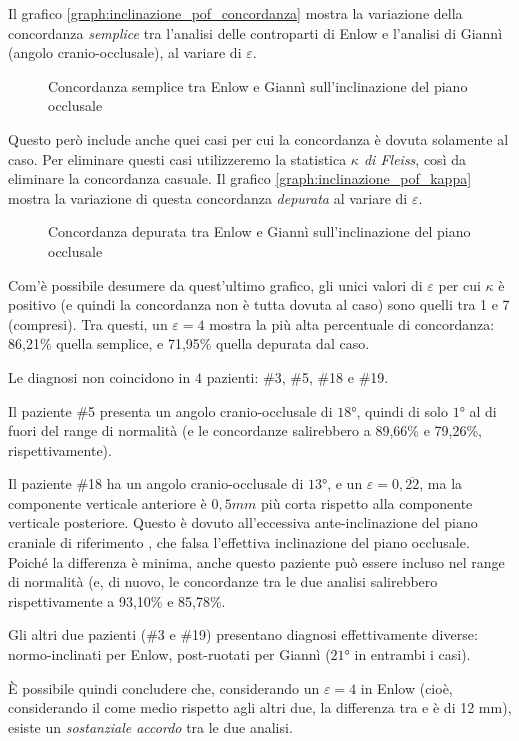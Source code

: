 Il grafico \vref{graph:inclinazione_pof_concordanza} mostra la variazione della concordanza \emph{semplice} tra l'analisi delle controparti di Enlow e l'analisi di Giannì (angolo cranio-occlusale), al variare di $\varepsilon$.

\begin{figure}[ht!]
\centering

\caption{Concordanza semplice tra Enlow e Giannì sull'inclinazione del piano occlusale}
\label{graph:inclinazione_pof_concordanza}
\end{figure}

Questo però include anche quei casi per cui la concordanza è dovuta solamente al caso. Per eliminare questi casi utilizzeremo la statistica \emph{$\kappa$ di Fleiss}, così da eliminare la concordanza casuale. Il grafico \vref{graph:inclinazione_pof_kappa} mostra la variazione di questa concordanza \emph{depurata} al variare di $\varepsilon$.

\begin{figure}[ht!]
\centering

\caption{Concordanza depurata tra Enlow e Giannì sull'inclinazione del piano occlusale}
\label{graph:inclinazione_pof_depurata}
\end{figure}

Com'è possibile desumere da quest'ultimo grafico, gli unici valori di $\varepsilon$ per cui $\kappa$ è positivo (e quindi la concordanza non è tutta dovuta al caso) sono quelli tra 1 e 7 (compresi). Tra questi, un $\varepsilon = 4$ mostra la più alta percentuale di concordanza: 86,21\% quella semplice, e 71,95\% quella depurata dal caso.

Le diagnosi non coincidono in $4$ pazienti: \#3, \#5, \#18 e \#19.

Il paziente \#5 presenta un angolo cranio-occlusale di $18°$, quindi di solo $1°$ al di fuori del range di normalità (e le concordanze salirebbero a 89,66\% e 79,26\%, rispettivamente).

Il paziente \#18 ha un angolo cranio-occlusale di $13°$, e un $\varepsilon = 0,\overline{22}$, ma la componente verticale anteriore è $0,5 mm$ più corta rispetto alla componente verticale posteriore. Questo è dovuto all'eccessiva ante-inclinazione del piano craniale di riferimento , che falsa l'effettiva inclinazione del piano occlusale. Poiché la differenza è minima, anche questo paziente può essere incluso nel range di normalità (e, di nuovo, le concordanze tra le due analisi salirebbero rispettivamente a 93,10\% e 85,78\%.

Gli altri due pazienti (\#3 e \#19) presentano diagnosi effettivamente diverse: normo-inclinati per Enlow, post-ruotati per Giannì ($21°$ in entrambi i casi).

È possibile quindi concludere che, considerando un $\varepsilon = 4$ in Enlow (cioè, considerando il  come medio rispetto agli altri due, la differenza tra  e  è di 12 mm), esiste un \emph{sostanziale accordo} tra le due analisi.